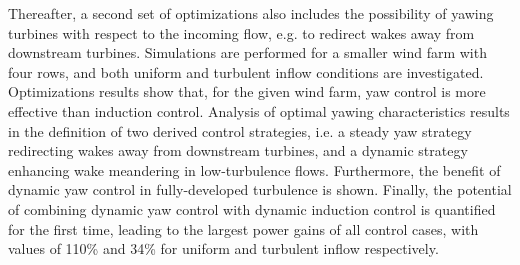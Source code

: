 Thereafter, a second set of optimizations also includes the possibility of yawing turbines with respect to the incoming flow, e.g. to redirect wakes away from downstream turbines. Simulations are performed for a smaller wind farm with four rows, and both uniform and turbulent inflow conditions are investigated. Optimizations results show that, for the given wind farm, yaw control is more effective than induction control. Analysis of optimal yawing characteristics results in the definition of two derived control strategies, i.e. a steady yaw strategy redirecting wakes away from downstream turbines, and a dynamic strategy enhancing wake meandering in low-turbulence flows. Furthermore, the benefit of dynamic yaw control in fully-developed turbulence is shown. Finally, the potential of combining dynamic yaw control with dynamic induction control is quantified for the first time, leading to the largest power gains of all control cases, with values of 110\% and 34\% for uniform and turbulent inflow respectively. 



\cleardoublepage

